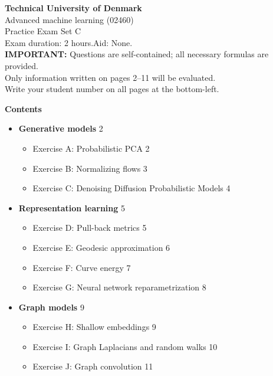 \documentclass[12pt,a4paper]{article}
\begin{document}
\begin{center}
{\large\bfseries Technical University of Denmark}\\[4pt]
{\large Advanced machine learning (02460)}\\[4pt]
{\large Practice Exam Set C}\\[4pt]
Exam duration: 2 hours.\quad Aid: None.\\[2pt]
\textbf{IMPORTANT:} Questions are self-contained; all necessary formulas are provided.\\
Only information written on pages 2--11 will be evaluated.\\
Write your student number on all pages at the bottom-left.
\end{center}

\bigskip
\textbf{Contents}
\begin{itemize}[noitemsep]
  \item[\textbf{I}] \textbf{Generative models} \hfill 2
  \begin{itemize}[noitemsep]
    \item Exercise A: Probabilistic PCA \hfill 2
    \item Exercise B: Normalizing flows \hfill 3
    \item Exercise C: Denoising Diffusion Probabilistic Models \hfill 4
  \end{itemize}
  \item[\textbf{II}] \textbf{Representation learning} \hfill 5
  \begin{itemize}[noitemsep]
    \item Exercise D: Pull-back metrics \hfill 5
    \item Exercise E: Geodesic approximation \hfill 6
    \item Exercise F: Curve energy \hfill 7
    \item Exercise G: Neural network reparametrization \hfill 8
  \end{itemize}
  \item[\textbf{III}] \textbf{Graph models} \hfill 9
  \begin{itemize}[noitemsep]
    \item Exercise H: Shallow embeddings \hfill 9
    \item Exercise I: Graph Laplacians and random walks \hfill 10
    \item Exercise J: Graph convolution \hfill 11
  \end{itemize}
\end{itemize}

\newpage
\end{document}
